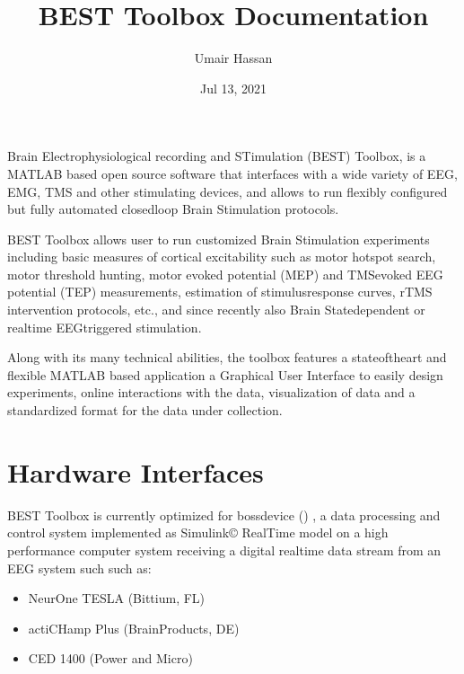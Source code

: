 \documentclass[letterpaper,10pt,english]{sphinxmanual}
\title{BEST Toolbox Documentation}
\date{Jul 13, 2021}
\author{Umair Hassan}
\begin{document}
\pagestyle{empty}
\sphinxmaketitle
\pagestyle{plain}
\sphinxtableofcontents
\pagestyle{normal}
\label{\detokenize{index::doc}}


\sphinxAtStartPar
Brain Electrophysiological recording and STimulation (BEST) Toolbox, is a MATLAB based open source software that interfaces with a wide variety of EEG, EMG, TMS and other stimulating devices, and allows to run flexibly configured but fully automated closed\sphinxhyphen{}loop Brain Stimulation protocols.

\sphinxAtStartPar
BEST Toolbox allows user to run customized Brain Stimulation experiments including basic measures of cortical excitability such as motor hotspot search, motor threshold hunting, motor evoked potential (MEP) and TMS\sphinxhyphen{}evoked EEG potential (TEP) measurements, estimation of stimulus\sphinxhyphen{}response curves, rTMS intervention protocols, etc., and since recently also Brain State\sphinxhyphen{}dependent or real\sphinxhyphen{}time EEG\sphinxhyphen{}triggered stimulation.

\sphinxAtStartPar
Along with its many technical abilities, the toolbox features a state\sphinxhyphen{}of\sphinxhyphen{}the\sphinxhyphen{}art and flexible MATLAB based application \textendash{} a Graphical User Interface to easily design experiments, online interactions with the data, visualization of data and a standardized format for the data under collection.


\chapter{Hardware Interfaces}
\label{\detokenize{index:hardware-interfaces}}
\sphinxAtStartPar
BEST Toolbox is currently optimized for bossdevice  () , a data processing and control system implemented as Simulink© Real\sphinxhyphen{}Time model on a high performance computer system receiving a digital real\sphinxhyphen{}time data stream from an EEG system such such as:
\begin{itemize}
\item {} 
\sphinxAtStartPar
NeurOne TESLA (Bittium, FL)

\item {} 
\sphinxAtStartPar
actiCHamp Plus (BrainProducts, DE)

\item {} 
\sphinxAtStartPar
CED 1400 (Power and Micro)

\end{itemize}
\end{document}
